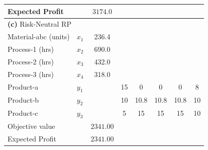 \documentclass[7pt]{article}
\begin{document}
\begin{table}[h!]
\begin{tabular}{ll|c|ccccc}
        Expected Profit       &                                            & $3174.0$        &                                                                                     \\
        \midrule
        \multicolumn{8}{l}{\textbf{(c)} Risk-Neutral RP}                                                                                                                           \\
        \midrule
        Material-abc (units)  & $x_1$                                      & 236.4           &              &                   &               &                  &               \\
        Process-1 (hrs)       & $x_2$                                      & 690.0           &              &                   &               &                  &               \\
        Process-2 (hrs)       & $x_3$                                      & 432.0           &              &                   &               &                  &               \\
        Process-3 (hrs)       & $x_4$                                      & 318.0           &              &                   &               &                  &               \\
        Product-a             & $y_1$                                      &                 & 15           & 0                 & 0             & 0                & 8             \\
        Product-b             & $y_2$                                      &                 & 10           & 10.8              & 10.8          & 10.8             & 10            \\
        Product-c             & $y_3$                                      &                 & 5            & 15                & 15            & 15               & 10            \\
        Objective value       &                                            & $2341.00$       &                                                                                     \\
        Expected Profit       &                                            & $2341.00$       &                                                                                     \\
        \bottomrule
    \end{tabular}
\end{table}
\end{document}
